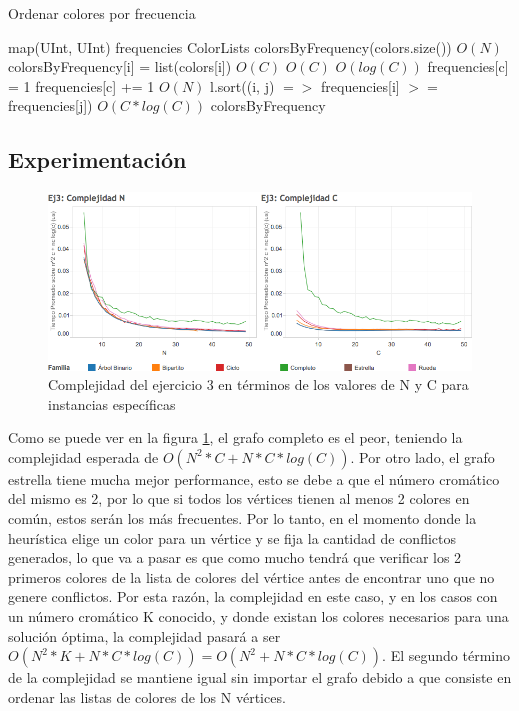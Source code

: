 \documentclass{article}
\theoremstyle{definition}
\theoremstyle{remark}
\begin{document}
\begin{algorithm}
\caption{Ordenar colores por frecuencia}
\begin{algorithmic}
    \State map(UInt, UInt) frequencies
    \State ColorLists colorsByFrequency(colors.size())
     \Comment $O(N)$
        \State colorsByFrequency[i] = list(colors[i]) \Comment $O(C)$
         \Comment $O(C)$
             \Comment $O(log(C))$
                \State frequencies[c] = 1
            \Else
                \State frequencies[c] += 1
            \EndIf
        \EndFor
    \EndFor
     \Comment $O(N)$
        \State l.sort((i, j) $=>$ frequencies[i] $>=$ frequencies[j]) \Comment $O(C * log(C))$
    \EndFor
    \State \Return colorsByFrequency
\EndFunction
\end{algorithmic}
\end{algorithm}

\subsection{Experimentación}


\begin{figure}
\centering
\includegraphics[width=15cm]{grf/Ej3Complexity}
\caption{Complejidad del ejercicio 3 en términos de los valores de N y C para instancias específicas}
\label{grf:ex3comp}
\end{figure}

Como se puede ver en la figura \ref{grf:ex3comp}, el grafo completo es el peor, teniendo la complejidad esperada de $O(N^{2}*C + N*C*log(C))$. Por otro lado, el grafo estrella tiene mucha mejor performance, esto se debe a que el número cromático del mismo es 2, por lo que si todos los vértices tienen al menos 2 colores en común, estos serán los más frecuentes. Por lo tanto, en el momento donde la heurística elige un color para un vértice y se fija la cantidad de conflictos generados, lo que va a pasar es que como mucho tendrá que verificar los 2 primeros colores de la lista de colores del vértice antes de encontrar uno que no genere conflictos. Por esta razón, la complejidad en este caso, y en los casos con un número cromático K conocido, y donde existan los colores necesarios para una solución óptima, la complejidad pasará a ser $O(N^{2}*K + N*C*log(C)) = O(N^{2} + N*C*log(C))$.
El segundo término de la complejidad se mantiene igual sin importar el grafo debido a que consiste en ordenar las listas de colores de los N vértices.
\end{document}
